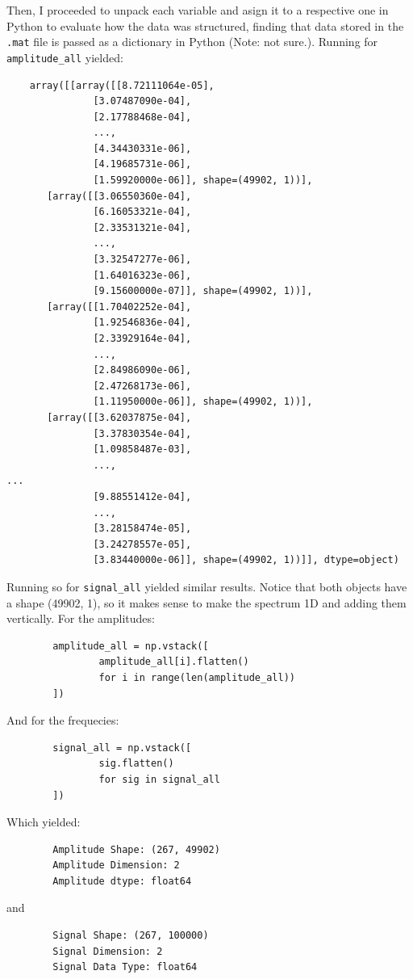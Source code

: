 Then, I proceeded to unpack each variable and asign it to a respective one in Python 
to evaluate how the data was structured, finding that data stored in the \verb|.mat| file 
is passed as a dictionary in Python (Note: not sure.). Running for \verb|amplitude_all|
yielded: 

\begin{verbatim}
    array([[array([[8.72111064e-05],
               [3.07487090e-04],
               [2.17788468e-04],
               ...,
               [4.34430331e-06],
               [4.19685731e-06],
               [1.59920000e-06]], shape=(49902, 1))],
       [array([[3.06550360e-04],
               [6.16053321e-04],
               [2.33531321e-04],
               ...,
               [3.32547277e-06],
               [1.64016323e-06],
               [9.15600000e-07]], shape=(49902, 1))],
       [array([[1.70402252e-04],
               [1.92546836e-04],
               [2.33929164e-04],
               ...,
               [2.84986090e-06],
               [2.47268173e-06],
               [1.11950000e-06]], shape=(49902, 1))],
       [array([[3.62037875e-04],
               [3.37830354e-04],
               [1.09858487e-03],
               ...,
...
               [9.88551412e-04],
               ...,
               [3.28158474e-05],
               [3.24278557e-05],
               [3.83440000e-06]], shape=(49902, 1))]], dtype=object)
\end{verbatim}

Running so for \verb|signal_all| yielded similar results. Notice that both objects 
have a shape (49902, 1), so it makes sense to make the spectrum 1D and adding them 
vertically. For the amplitudes: 

\begin{verbatim}
        amplitude_all = np.vstack([
                amplitude_all[i].flatten()
                for i in range(len(amplitude_all))
        ])
\end{verbatim}

And for the frequecies: 

\begin{verbatim}
        signal_all = np.vstack([
                sig.flatten()
                for sig in signal_all
        ])
\end{verbatim}

Which yielded: 

\begin{verbatim}
        Amplitude Shape: (267, 49902)
        Amplitude Dimension: 2
        Amplitude dtype: float64
\end{verbatim}
and 
\begin{verbatim}
        Signal Shape: (267, 100000)
        Signal Dimension: 2
        Signal Data Type: float64 
\end{verbatim}

